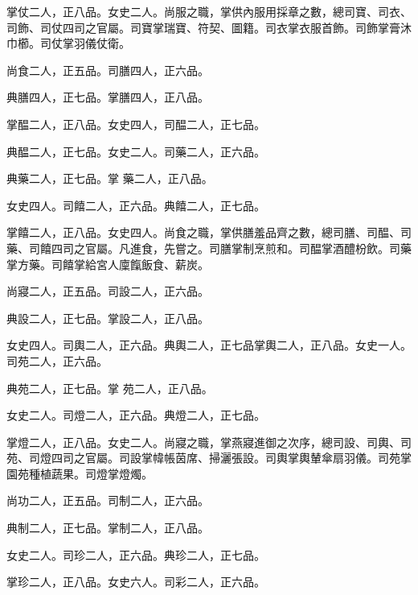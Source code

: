 \begin{pinyinscope}
 掌仗二人，正八品。女史二人。尚服之職，掌供內服用採章之數，總司寶、司衣、司飾、司仗四司之官屬。司寶掌瑞寶、符契、圖籍。司衣掌衣服首飾。司飾掌膏沐巾櫛。司仗掌羽儀仗衛。



 尚食二人，正五品。司膳四人，正六品。



 典膳四人，正七品。掌膳四人，正八品。



 掌醖二人，正八品。女史四人，司醖二人，正七品。



 典醖二人，正七品。女史二人。司藥二人，正六品。



 典藥二人，正七品。掌
 藥二人，正八品。



 女史四人。司饎二人，正六品。典饎二人，正七品。



 掌饎二人，正八品。女史四人。尚食之職，掌供膳羞品齊之數，總司膳、司醖、司藥、司饎四司之官屬。凡進食，先嘗之。司膳掌制烹煎和。司醖掌酒醴枌飲。司藥掌方藥。司饎掌給宮人廩餼飯食、薪炭。



 尚寢二人，正五品。司設二人，正六品。



 典設二人，正七品。掌設二人，正八品。



 女史四人。司輿二人，正六品。典輿二人，正七品掌輿二人，正八品。女史一人。司苑二人，正六品。



 典苑二人，正七品。掌
 苑二人，正八品。



 女史二人。司燈二人，正六品。典燈二人，正七品。



 掌燈二人，正八品。女史二人。尚寢之職，掌燕寢進御之次序，總司設、司輿、司苑、司燈四司之官屬。司設掌幃帳茵席、掃灑張設。司輿掌輿輦傘扇羽儀。司苑掌園苑種植蔬果。司燈掌燈燭。



 尚功二人，正五品。司制二人，正六品。



 典制二人，正七品。掌制二人，正八品。



 女史二人。司珍二人，正六品。典珍二人，正七品。



 掌珍二人，正八品。女史六人。司彩二人，正六品。




\end{pinyinscope}
